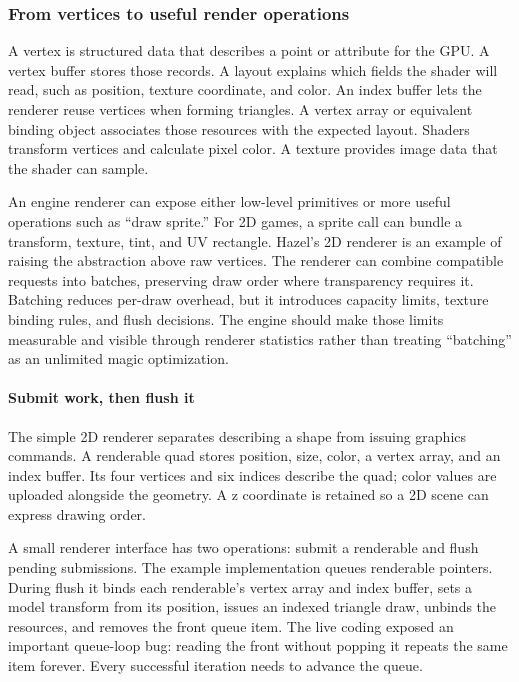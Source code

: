 \subsubsection{From vertices to useful render operations}\label{06-engine-ii-ch025-from-vertices-to-useful-render-operations}

A vertex is structured data that describes a point or attribute for the GPU. A vertex buffer stores those records. A layout explains which fields the shader will read, such as position, texture coordinate, and color. An index buffer lets the renderer reuse vertices when forming triangles. A vertex array or equivalent binding object associates those resources with the expected layout. Shaders transform vertices and calculate pixel color. A texture provides image data that the shader can sample.

An engine renderer can expose either low-level primitives or more useful operations such as ``draw sprite.'' For 2D games, a sprite call can bundle a transform, texture, tint, and UV rectangle. Hazel's 2D renderer is an example of raising the abstraction above raw vertices. The renderer can combine compatible requests into batches, preserving draw order where transparency requires it. Batching reduces per-draw overhead, but it introduces capacity limits, texture binding rules, and flush decisions. The engine should make those limits measurable and visible through renderer statistics rather than treating ``batching'' as an unlimited magic optimization.

\paragraph{Submit work, then flush it}\label{06-engine-ii-ch025-submit-work-then-flush-it}

The simple 2D renderer separates describing a shape from issuing graphics commands. A renderable quad stores position, size, color, a vertex array, and an index buffer. Its four vertices and six indices describe the quad; color values are uploaded alongside the geometry. A z coordinate is retained so a 2D scene can express drawing order.

A small renderer interface has two operations: submit a renderable and flush pending submissions. The example implementation queues renderable pointers. During flush it binds each renderable's vertex array and index buffer, sets a model transform from its position, issues an indexed triangle draw, unbinds the resources, and removes the front queue item. The live coding exposed an important queue-loop bug: reading the front without popping it repeats the same item forever. Every successful iteration needs to advance the queue.

